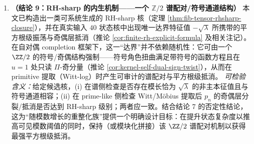 \begin{enumerate}
  \item \textbf{（结论 9：RH-sharp 的内生机制——一个 \texorpdfstring{$\mathbb{Z}/2$}{Z/2} 谱配对/符号通道结构）}
  本文已构造出一类可系统生成的 RH-sharp 核（定理 \ref{thm:fib-tensor-rhsharp-closure}），并在真实输入 \(40\) 状态核中出现唯一达界特征值 \(-\sqrt{\lambda}\) 所携带的平方根级振荡与奇偶层抵消（推论 \ref{cor:finite-rh-explicit-formula} 及相关注记）。
  在自对偶 completion 框架下，这一“达界”并不依赖随机性：它可由一个 \(\ZZ/2\) 的符号/奇偶结构强制——符号角色扭曲满足带符号的函数方程且在 \(u=1\) 处只读 \(\Pi\)-奇分量（推论 \ref{cor:kernel-self-dual-sign-twist}），从而在 primitive 提取（Witt-log）时产生可审计的谱配对与平方根级抵消。
  \emph{可检验含义：}给定候选核，(i) 在谱侧检查是否存在模长恰为 \(\sqrt{\lambda}\) 的非主本征值且与符号通道相容；(ii) 在 prime-like 侧检查 Witt/Möbius 提取后 \(p_n\) 的奇偶层分裂/抵消是否达到 RH-sharp 级别；两者应一致。结合结论 7 的否定性结论，这为“随模数增长的重整化族”提供一个明确设计目标：在提升状态复杂度以推高可见模数阈值的同时，保持（或模块化拼接）该 \(\ZZ/2\) 谱配对机制以获得最强平方根级抵消。
\end{enumerate}

